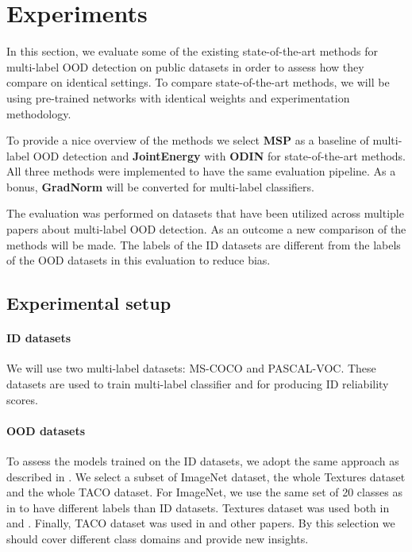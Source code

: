 \section{Experiments}
In this section, we evaluate some of the existing state-of-the-art methods for multi-label OOD detection
 on public datasets in order to assess how they compare on identical settings. 
 To compare state-of-the-art methods, we will be using pre-trained networks with identical weights and experimentation methodology.

To provide a nice overview of the methods we select \textbf{MSP} as a baseline of multi-label OOD detection and \textbf{JointEnergy} with \textbf{ODIN} for state-of-the-art methods.
All three methods were implemented to have the same evaluation pipeline. 
As a bonus, \textbf{GradNorm} will be converted for multi-label classifiers.

The evaluation was performed on datasets that have been utilized across multiple papers about multi-label OOD detection. 
As an outcome a new comparison of the methods will be made. 
The labels of the ID datasets are different from the labels of the OOD datasets in this evaluation to reduce bias.

\subsection{Experimental setup}
\paragraph{ID datasets}
We will use two multi-label datasets: MS-COCO\cite{linMicrosoftCOCOCommon2015} and PASCAL-VOC\cite{everinghamPascalVisualObject2015}. 
These datasets are used to train multi-label classifier and for producing ID reliability scores. 

\paragraph{OOD datasets}
To assess the models trained on the ID datasets, we adopt the same approach as described in \cite{Wang2021}. 
We select a subset of ImageNet\cite{dengImageNetLargescaleHierarchical2009} dataset, the whole Textures\cite{cimpoiDescribingTexturesWild2013} dataset and the whole TACO\cite{proencaTACOTrashAnnotations2020} dataset.
For ImageNet, we use the same set of 20 classes as in \cite{Wang2021} to have different labels than ID datasets.
Textures dataset was used both in \cite{Wang2021} and \cite{huangImportanceGradientsDetecting2021}.
Finally, TACO dataset was used in \cite{Zolfi2022} and other papers.
By this selection we should cover different class domains and provide new insights.

